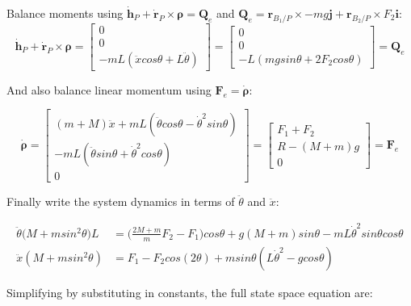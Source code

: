 \documentclass[../main.tex]{subfiles}
\begin{document}
Balance moments using $\boldsymbol{\dot{h}}_P + \boldsymbol{\dot{r}}_P \times \boldsymbol{\rho} = \boldsymbol{Q}_{e}$ and $ \boldsymbol{Q}_{e} = \boldsymbol{r}_{B_1/P} \times -mg\boldsymbol{j} + \boldsymbol{r}_{B_2/P} \times F_2 \boldsymbol{i}$:
\begin{equation*}
\boldsymbol{\dot{h}}_P + \boldsymbol{\dot{r}}_P \times \boldsymbol{\rho} = 
\begin{bmatrix} 0 \\ 0 \\ -m L (\ddot{x} cos\theta + L\ddot{\theta}) \end{bmatrix} = \begin{bmatrix} 0 \\ 0 \\ -L(m g sin\theta + 2 F_2 cos \theta) \end{bmatrix} = \boldsymbol{Q}_e
\end{equation*}

And also balance linear momentum using $\boldsymbol{F}_e = \dot{\boldsymbol{\rho}}$:

\begin{equation*}
    \dot{\boldsymbol{\rho}} = \begin{bmatrix} (m+M)\ddot{x} + m L(\ddot{\theta}cos\theta - \dot{\theta}^2 sin\theta) \\ -m L(\ddot{\theta}sin\theta + \dot{\theta}^2 cos\theta) \\ 0 \end{bmatrix}
    = \begin{bmatrix} F_1 + F_2 \\ R-(M+m)g \\ 0 \end{bmatrix} = \boldsymbol{F}_e
\end{equation*}

Finally write the system dynamics in terms of $\ddot{\theta}$ and $\ddot{x}$:

\begin{align}
\ddot{\theta}\big(M+m sin^2\theta \big)L & = \bigg(\frac{2M+m}{m}F_2-F_1\bigg)cos\theta + g(M+m)sin\theta - mL\dot{\theta}^2 sin\theta cos\theta\\
\ddot{x}(M+m sin^2\theta) & = F_1 - F_2cos(2\theta)+ m sin\theta(L\dot{\theta}^2-g cos\theta)
\end{align}

Simplifying by substituting in constants, the full state space equation are:
\end{document}
